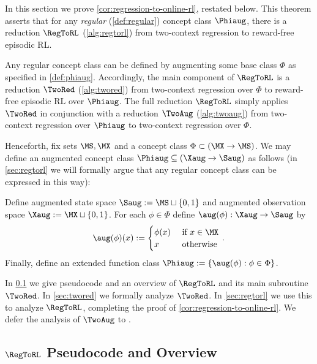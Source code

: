 

In this section we prove \cref{cor:regression-to-online-rl}, restated below. This theorem asserts that for any \emph{regular} (\cref{def:regular}) concept class $\Phiaug$, there is a reduction $\RegToRL$ (\cref{alg:regtorl}) from two-context regression to reward-free episodic RL.

\regtorl*

Any regular concept class can be defined by augmenting some base class $\Phi$ as specified in \cref{def:phiaug}. Accordingly, the main component of $\RegToRL$ is a reduction $\TwoRed$ (\cref{alg:twored}) from two-context regression over $\Phi$ to reward-free episodic RL over $\Phiaug$. The full reduction $\RegToRL$ simply applies $\TwoRed$ in conjunction with a reduction $\TwoAug$ (\cref{alg:twoaug}) from two-context regression over $\Phiaug$ to two-context regression over $\Phi$.

Henceforth, fix sets $\MS,\MX$ and a concept class $\Phi \subset (\MX\to\MS)$. We may define an augmented concept class $\Phiaug \subseteq (\Xaug\to\Saug)$ as follows (in \cref{sec:regtorl} we will formally argue that any regular concept class can be expressed in this way):

\begin{definition}\label{def:phiaug}
Define augmented state space $\Saug := \MS \sqcup \{0,1\}$ and augmented observation space $\Xaug := \MX \sqcup \{0,1\}$. For each $\phi \in \Phi$ define $\aug(\phi): \Xaug \to \Saug$ by
\[\aug(\phi)(x) := \begin{cases} \phi(x) & \text { if } x \in \MX \\ x & \text { otherwise } \end{cases}.\]
Finally, define an extended function class $\Phiaug := \{\aug(\phi): \phi\in\Phi\}$.
\end{definition}

In \cref{sec:regtorl-overview} we give pseudocode and an overview of $\RegToRL$ and its main subroutine $\TwoRed$. In \cref{sec:twored} we formally analyze $\TwoRed$. In \cref{sec:regtorl} we use this to analyze $\RegToRL$, completing the proof of \cref{cor:regression-to-online-rl}. We defer the analysis of $\TwoAug$ to .

\subsection{$\RegToRL$ Pseudocode and Overview}\label{sec:regtorl-overview}

